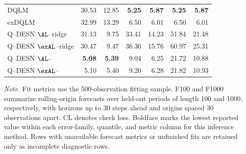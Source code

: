 \begin{longtable}{@{}lrrrrrr@{}}
DQLM & 30.53 & 12.85 & \textbf{5.25} & \textbf{5.87} & \textbf{5.25} & \textbf{5.87} \\
exDQLM & 32.99 & 13.29 & 6.50 & 6.01 & 6.50 & 6.01 \\
Q--DESN \(\AL\)--ridge & 31.13 & 9.75 & 33.41 & 14.23 & 51.84 & 21.48 \\
Q--DESN \(\exAL\)--ridge & 30.47 & 9.47 & 36.36 & 15.76 & 60.97 & 25.31 \\
Q--DESN \(\AL\)--\RHS{} & \textbf{5.08} & \textbf{5.39} & 9.04 & 6.25 & 21.72 & 10.88 \\
Q--DESN \(\exAL\)--\RHS{} & 5.10 & 5.40 & 9.20 & 6.28 & 21.82 & 10.93 \\
\end{longtable}
\par\noindent\begin{minipage}{0.97\textwidth}\footnotesize
\emph{Note.} Fit metrics use the 500-observation fitting sample. F100 and F1000 summarize rolling-origin forecasts over held-out periods of length 100 and 1000, respectively, with horizons up to 30 steps ahead and origins spaced 30 observations apart. CL denotes check loss. Boldface marks the lowest reported value within each error-family, quantile, and metric column for this inference method. Rows with unavailable forecast metrics or unfinished fits are retained only as incomplete diagnostic rows.
\end{minipage}
\par\endgroup
